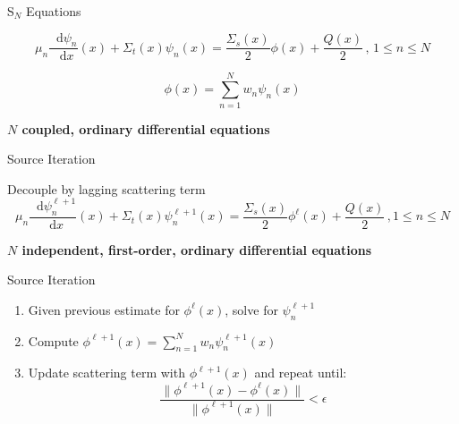 \documentclass[10pt]{beamer}
\newcommand{\SN}{S$_N$\xspace}
\newcommand{\ud}{\mathop{}\!\mathrm{d}} %
\newcommand{\dderiv}[2]{\frac{\ud #1}{\ud #2}}
\begin{document}
\begin{frame}{\SN Equations}

    \begin{equation*}
        \mu_n \dderiv{\psi_n}{x}(x) + \Sigma_t(x) \psi_n(x) = 
        \frac{\Sigma_s(x)}{2} \phi(x) + \frac{Q(x)}{2} \,, \, 1 \leq n \leq N
    \end{equation*}

    \begin{equation*}
        \phi(x) = \sum_{n=1}^N w_n \psi_n(x)
    \end{equation*}

    \vfill
    \centerline{\textbf{$N$ coupled, ordinary differential equations}}

\end{frame}

\begin{frame}{Source Iteration}

    Decouple by lagging scattering term 
    \begin{equation*}
        \mu_n \dderiv{\psi_n^{\ell+1}}{x}(x) + \Sigma_t(x) \psi_n^{\ell+1}(x) = 
        \frac{\Sigma_s(x)}{2} \phi^{\ell}(x) + \frac{Q(x)}{2} \,, 1 \leq n \leq N        
    \end{equation*}

    \textbf{$N$ independent, first-order, ordinary differential equations}

    \begin{exampleblock}{Source Iteration}
    \begin{enumerate}
        \item Given previous estimate for $\phi^{\ell}(x)$, solve for $\psi_n^{\ell+1}$

        \item Compute $\phi^{\ell+1}(x) = 
            \sum_{n=1}^N w_n \psi_n^{\ell+1}(x)$ 

        \item Update scattering term with $\phi^{\ell+1}(x)$ and repeat until: 
             \begin{equation*}
                \frac{\|\phi^{\ell+1}(x) - \phi^{\ell}(x)\|}{\|\phi^{\ell+1}(x)\|} < \epsilon 
             \end{equation*}

    \end{enumerate}
    \end{exampleblock}

\end{frame}
\end{document}
